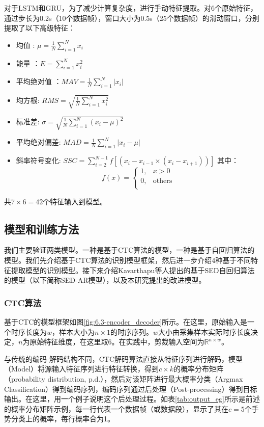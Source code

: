 对于LSTM和GRU，为了减少计算复杂度，进行手动特征提取。对6个原始特征，通过步长为0.2s（10个数据帧），窗口大小为0.5s（25个数据帧）的滑动窗口，分别提取了以下高级特征：
\begin{itemize}
    \item 均值 : $\mu = \frac{1}{N}\sum_{i=1}^{N}x_i$
    \item 能量 ：$E = \sum_{i=1}^{N}x_i^2$
    \item 平均绝对值 ：$MAV = \frac{1}{N}\sum_{i=1}^{N}|x_i|$
    \item 均方根: $RMS = \sqrt{\frac{1}{N}\sum_{i=1}^{N}x_i^2}$
    \item 标准差: $\sigma =\sqrt{\frac{1}{N}\sum_{i=1}^{N}(x_i-\mu)^2}$
    \item 平均绝对偏差: $MAD=\frac{1}{N}\sum_{i=1}^{N}|x_i-\mu|$
    \item 斜率符号变化: $SSC = \sum_{i=2}^{N-1}f[(x_i-x_{i-1}\times (x_i-x_{i+1}))]$
    其中：
$$f(x) = 
\begin{cases} 
1,  & x > 0 \\
0,  & \text{others}\\
\end{cases}
$$
\end{itemize}

共$7\times 6=42$个特征输入到模型。

\subsection{模型和训练方法}\label{ssec:model_and_train}

我们主要验证两类模型。一种是基于CTC算法的模型，一种是基于自回归算法的模型。我们先介绍基于CTC算法的识别模型框架，然后进一步介绍4种基于不同特征提取模型的识别模型。接下来介绍Kavarthapu等人\cites{kavarthapu2017hand}提出的基于SED自回归算法的模型（以下简称SED-AR模型），以及本研究提出的改进模型。

\subsubsection{CTC算法}

基于CTC的模型框架如图\ref{fig:6.3-encoder_decoder}所示。在这里，原始输入是一个时序长度为$w$，样本大小为$n\times 1$的时序序列。$w$大小由采集样本实际时序长度决定，$n$为原始特征维度，在这里取6。在实践中，剪裁输入空间为$\mathbb{R}^{n\times w}$。

与传统的编码-解码结构不同，CTC解码算法直接从特征序列进行解码，模型（Model）将源输入特征序列进行特征转换，得到$c\times k$的概率分布矩阵（probability distribution, p.d.），然后对该矩阵进行最大概率分类（Argmax Classification）得到编码序列，编码序列通过后处理（Post-processing）得到目标输出。在这里，用一个例子说明这个后处理过程。如表\ref{tab:output_eg}所示是前述的概率分布矩阵示例，每一行代表一个数据帧（或数据段），显示了其在$c=5$个手势分类上的概率，每行概率合为1。

